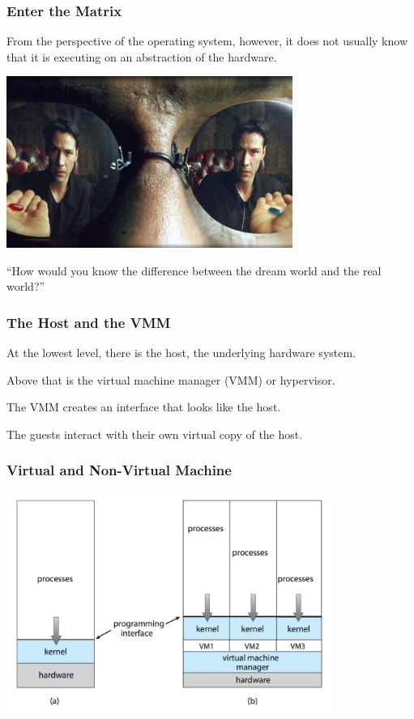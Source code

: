 \begin{frame}
\frametitle{Enter the Matrix}

From the perspective of the operating system, however, it does not usually know that it is executing on an abstraction of the hardware. 


\begin{center}
	\includegraphics[width=0.7\textwidth]{images/redbluepill.jpg}
\end{center}

``How would you know the difference between the dream world and the real world?''


\end{frame}

\begin{frame}
\frametitle{The Host and the VMM}


At the lowest level, there is the \alert{host}, the underlying hardware system. 

Above that is the \alert{virtual machine manager} (VMM) or \alert{hypervisor}.

The VMM creates an interface that looks like the host. 

The \alert{guests} interact with their own virtual copy of the host.

\end{frame}

\begin{frame}
\frametitle{Virtual and Non-Virtual Machine}

\begin{center}
	\includegraphics[width=0.8\textwidth]{images/non-virtual-machine.png}
\end{center}

\end{frame}

